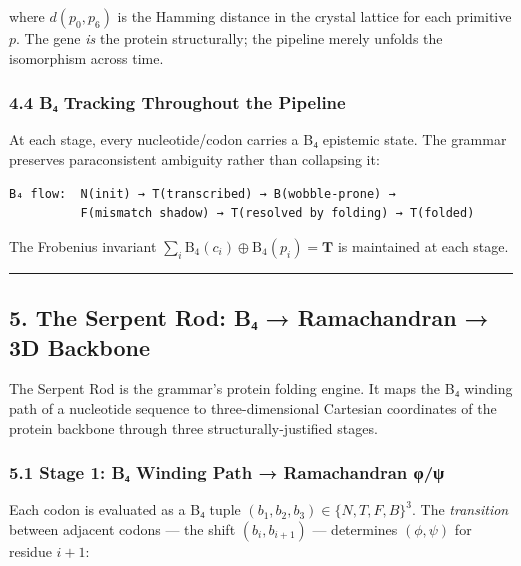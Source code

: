 where \(d(p_0, p_6)\) is the Hamming distance in the crystal lattice for
each primitive \(p\). The gene \emph{is} the protein structurally; the
pipeline merely unfolds the isomorphism across time.

\hypertarget{bux2084-tracking-throughout-the-pipeline}{%
\subsubsection{4.4 B₄ Tracking Throughout the
Pipeline}\label{bux2084-tracking-throughout-the-pipeline}}

At each stage, every nucleotide/codon carries a B₄ epistemic state. The
grammar preserves paraconsistent ambiguity rather than collapsing it:

\begin{verbatim}
B₄ flow:  N(init) → T(transcribed) → B(wobble-prone) → 
          F(mismatch shadow) → T(resolved by folding) → T(folded)
\end{verbatim}

The Frobenius invariant
\(\sum_i \text{B}_4(c_i) \oplus \text{B}_4(p_i) = \mathbf{T}\) is
maintained at each stage.

\begin{center}\rule{0.5\linewidth}{0.5pt}\end{center}

\hypertarget{the-serpent-rod-bux2084-ramachandran-3d-backbone}{%
\subsection{5. The Serpent Rod: B₄ → Ramachandran → 3D
Backbone}\label{the-serpent-rod-bux2084-ramachandran-3d-backbone}}

The Serpent Rod is the grammar's protein folding engine. It maps the B₄
winding path of a nucleotide sequence to three-dimensional Cartesian
coordinates of the protein backbone through three structurally-justified
stages.

\hypertarget{stage-1-bux2084-winding-path-ramachandran-ux3c6ux3c8}{%
\subsubsection{5.1 Stage 1: B₄ Winding Path → Ramachandran
φ/ψ}\label{stage-1-bux2084-winding-path-ramachandran-ux3c6ux3c8}}

Each codon is evaluated as a B₄ tuple
\((b_1, b_2, b_3) \in \{N, T, F, B\}^3\). The \emph{transition} between
adjacent codons --- the shift \((b_i, b_{i+1})\) --- determines
\((\phi, \psi)\) for residue \(i+1\):

